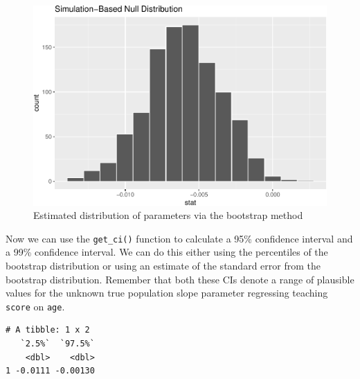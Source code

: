 \documentclass[]{article}
\newenvironment{Shaded}{\begin{snugshade}}{\end{snugshade}}
\newcommand{\KeywordTok}[1]{\textcolor[rgb]{0.13,0.29,0.53}{\textbf{#1}}}
\newcommand{\DataTypeTok}[1]{\textcolor[rgb]{0.13,0.29,0.53}{#1}}
\newcommand{\DecValTok}[1]{\textcolor[rgb]{0.00,0.00,0.81}{#1}}
\newcommand{\FloatTok}[1]{\textcolor[rgb]{0.00,0.00,0.81}{#1}}
\newcommand{\StringTok}[1]{\textcolor[rgb]{0.31,0.60,0.02}{#1}}
\newcommand{\OperatorTok}[1]{\textcolor[rgb]{0.81,0.36,0.00}{\textbf{#1}}}
\newcommand{\NormalTok}[1]{#1}
\begin{document}
\begin{figure}
\centering
\includegraphics{DAWeek8_files/figure-latex/sampling1-1.pdf}
\caption{\label{fig.sampling1}Estimated distribution of parameters via
the bootstrap method}
\end{figure}

Now we can use the \texttt{get\_ci()} function to calculate a 95\%
confidence interval and a 99\% confidence interval. We can do this
either using the percentiles of the bootstrap distribution or using an
estimate of the standard error from the bootstrap distribution. Remember
that both these CIs denote a range of plausible values for the unknown
true population slope parameter regressing teaching \texttt{score} on
\texttt{age}.

\begin{Shaded}
\end{Shaded}

\begin{verbatim}
# A tibble: 1 x 2
   `2.5%`  `97.5%`
    <dbl>    <dbl>
1 -0.0111 -0.00130
\end{verbatim}

\begin{Shaded}
\end{Shaded}
\end{document}
